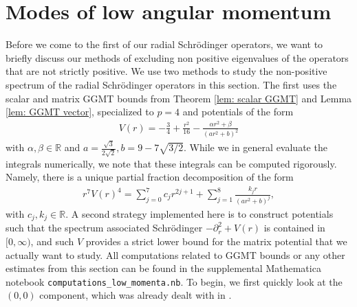 \documentclass[11pt,reqno]{amsart}
\theoremstyle{remark}
\newcommand{\R}{\mathbb{R}}
\theoremstyle{definition}
\begin{document}
\section{Modes of low angular momentum}\label{section: low angulars}
Before we come to the first of our radial Schrödinger operators, we want to briefly discuss our methods of excluding non positive eigenvalues of the operators that are not strictly positive. We use two methods to study the non-positive spectrum of the radial
Schrödinger operators in this section. The first uses the scalar and
matrix GGMT bounds from Theorem \ref{lem: scalar GGMT}
and Lemma \ref{lem: GGMT vector}, specialized to $p=4$ and potentials of the form
\begin{align*}
    V(r)= -\frac{3}{4}+\frac{r^2}{16}-\frac{\alpha r^2  + \beta}{(ar^2 + b)^2}
\end{align*}
with $\alpha,\beta \in \R$ and $a=\frac{\sqrt{3}}{2\sqrt{2}}, b=9-7\sqrt{3/2}.$ While we in general evaluate the integrals numerically, we note that these integrals can be computed rigorously. Namely, there is a unique partial fraction decomposition of the form  
\begin{align*}
    r^7 V(r)^4
=
\sum_{j=0}^{7} c_j r^{2j+1}
+
\sum_{j=1}^{8}\frac{k_j r}{(ar^2+b)^j},
\end{align*}
with $c_j, k_j \in \R$. 
A second strategy implemented here is to construct potentials such that the spectrum associated Schrödinger $-\partial_r^2+V(r)$  is contained in $[0,\infty)$, and such $V$ provides a strict lower bound for the matrix potential that we actually want to study. All computations related to GGMT bounds or any other estimates from this section can be found in the supplemental Mathematica notebook \texttt{computations\_low\_momenta.nb}.
To begin, we first quickly look at the $(0,0)$ component, which was already dealt with in \cite{GloSch20}.
\end{document}
